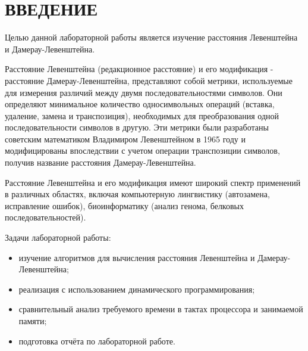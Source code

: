 \section*{ВВЕДЕНИЕ}

Целью данной лабораторной работы является изучение расстояния Левенштейна и Дамерау-Левенштейна.

Расстояние Левенштейна (редакционное расстояние) и его модификация - расстояние Дамерау-Левенштейна, представляют собой метрики, используемые для измерения различий между двумя последовательностями символов.
Они определяют минимальное количество односимвольных операций (вставка, удаление, замена и транспозиция), необходимых для преобразования одной последовательности символов в другую.
Эти метрики были разработаны советским математиком Владимиром Левенштейном в 1965 году и модифицированы впоследствии с учетом операции транспозиции символов, получив название расстояния Дамерау-Левенштейна.

Расстояние Левенштейна и его модификация имеют широкий спектр применений в различных областях, включая компьютерную лингвистику (автозамена, исправление ошибок), биоинформатику (анализ генома, белковых последовательностей).

Задачи лабораторной работы:
\begin{itemize}
    \item изучение алгоритмов для вычисления расстояния Левенштейна и Дамерау-Левенштейна;
    \item реализация с использованием динамического программирования;
    \item сравнительный анализ требуемого времени в тактах процессора и занимаемой памяти;
    \item подготовка отчёта по лабораторной работе.
\end{itemize}

